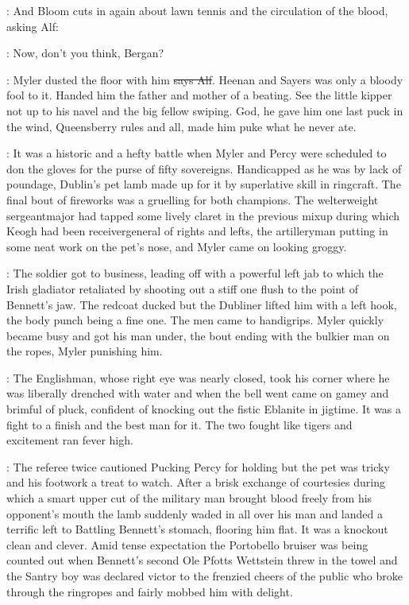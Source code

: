 \Nq:
And Bloom cuts in again about lawn tennis and the circulation of the
blood, asking Alf:

\Bloom:
Now, don't you think, Bergan?

\bergan:
Myler dusted the floor with him \sout{says Alf}.
Heenan and Sayers was only a
bloody fool to it. Handed him the father and mother of a beating. See the
little kipper not up to his navel and the big fellow swiping. God, he gave
him one last puck in the wind, Queensberry rules and all, made him puke
what he never ate.

:
It was a historic and a hefty battle when Myler and Percy were
scheduled to don the gloves for the purse of fifty sovereigns. Handicapped
as he was by lack of poundage, Dublin's pet lamb made up for it by
superlative skill in ringcraft. The final bout of fireworks was a
gruelling for both champions. The welterweight sergeantmajor had
tapped some lively claret in the previous mixup during which Keogh
had been receivergeneral of rights and lefts, the artilleryman
putting in some neat work on the pet's nose, and Myler came on
looking groggy.

:
The soldier got to business, leading off with a
powerful left jab to which the Irish gladiator retaliated by shooting
out a stiff one flush to the point of Bennett's jaw. The redcoat
ducked but the Dubliner lifted him with a left hook, the body punch being
a fine one. The men came to handigrips. Myler quickly became busy and got
his man under, the bout ending with the bulkier man on the ropes, Myler
punishing him.

:
The Englishman, whose right eye was nearly closed, took
his corner where he was liberally drenched with water and when the bell
went came on gamey and brimful of pluck, confident of knocking out the
fistic Eblanite in jigtime. It was a fight to a finish and the best man
for it. The two fought like tigers and excitement ran fever high.

:
The referee twice cautioned Pucking Percy for holding but the pet was tricky
and his footwork a treat to watch. After a brisk exchange of courtesies
during which a smart upper cut of the military man brought blood freely
from his opponent's mouth the lamb suddenly waded in all over his man and
landed a terrific left to Battling Bennett's stomach, flooring him flat.
It was a knockout clean and clever. Amid tense expectation the Portobello
bruiser was being counted out when Bennett's second Ole Pfotts Wettstein
threw in the towel and the Santry boy was declared victor to the frenzied
cheers of the public who broke through the ringropes and fairly mobbed him
with delight.

